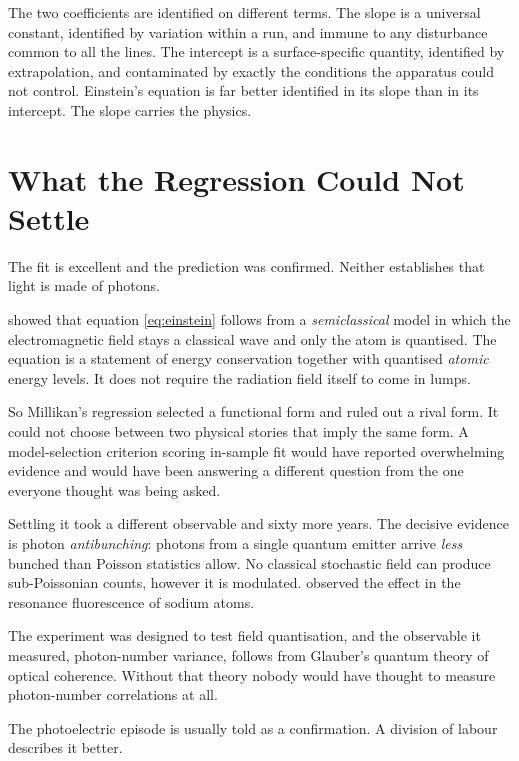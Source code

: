 \documentclass[11pt]{article}
\begin{document}
The two coefficients are identified on different terms.  The slope is a
universal constant, identified by variation within a run, and immune to any
disturbance common to all the lines.  The intercept is a surface-specific
quantity, identified by extrapolation, and contaminated by exactly the
conditions the apparatus could not control.  Einstein's equation is far better
identified in its slope than in its intercept.  The slope carries the
physics.

\section{What the Regression Could Not Settle}
\label{sec:limits}

The fit is excellent and the prediction was confirmed.  Neither establishes
that light is made of photons.

\citet{Lamb1969} showed that equation \eqref{eq:einstein} follows from a
\emph{semiclassical} model in which the electromagnetic field stays a
classical wave and only the atom is quantised.  The equation is a statement of
energy conservation together with quantised \emph{atomic} energy levels.  It
does not require the radiation field itself to come in lumps.

So Millikan's regression selected a functional form and ruled out a rival
form.  It could not choose between two physical stories that imply the same
form.  A model-selection criterion scoring in-sample fit would have reported
overwhelming evidence and would have been answering a different question from
the one everyone thought was being asked.

Settling it took a different observable and sixty more years.  The decisive
evidence is photon \emph{antibunching}: photons from a single quantum emitter
arrive \emph{less} bunched than Poisson statistics allow.  No classical
stochastic field can produce sub-Poissonian counts, however it is modulated.
\citet{Kimble1977} observed the effect in the resonance fluorescence of
sodium atoms.

The experiment was designed to test field quantisation, and the observable it
measured, photon-number variance, follows from Glauber's quantum theory of
optical coherence.  Without that theory nobody would have thought to measure
photon-number correlations at all.

The photoelectric episode is usually told as a confirmation.  A division of
labour describes it better.
\end{document}
